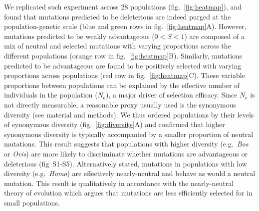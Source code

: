 \documentclass{article}
\newcommand{\Ne}{N_{\textrm{e}}}
\newcommand{\Sphy}{S}
\newcommand{\divWeakAdv}{0 < \Sphy < 1}
\begin{document}
    We replicated such experiment across 28 populations (fig.~\ref{fig:heatmap}), and found that mutations predicted to be deleterious are indeed purged at the population-genetic scale (blue and green rows in fig.~\ref{fig:heatmap}A).
    However, mutations predicted to be weakly advantageous ($\divWeakAdv$) are composed of a mix of neutral and selected mutations with varying proportions across the different populations (orange row in fig.~\ref{fig:heatmap}B).
    Similarly, mutations predicted to be advantageous are found to be positively selected with varying proportions across populations (red row in fig.~\ref{fig:heatmap}C).
    These variable proportions between populations can be explained by the effective number of individuals in the population ($\Ne$), a major driver of selection efficacy.
    Since $\Ne$ is not directly measurable, a reasonable proxy usually used is the synonymous diversity (see material and methods).
    We thus ordered populations by their levels of synonymous diversity (fig.~\ref{fig:diversity}A) and confirmed that higher synonymous diversity is typically accompanied by a smaller proportion of neutral mutations.
    This result suggests that populations with higher diversity (e.g.~\textit{Bos} or \textit{Ovis}) are more likely to discriminate whether mutations are advantageous or deleterious (fig~S1-S5).
    Alternatively stated, mutations in populations with low diversity (e.g.~\textit{Homo}) are effectively nearly-neutral and behave as would a neutral mutation.
    This result is qualitatively in accordance with the nearly-neutral theory of evolution which argues that mutations are less efficiently selected for in small populations.
\end{document}

